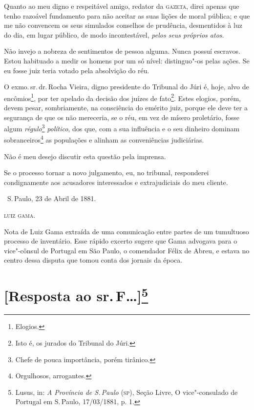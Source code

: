 Quanto ao meu digno e respeitável amigo, redator da \textsc{gazeta}, direi
apenas que tenho razoável fundamento para não aceitar as suas lições de
moral pública; e que me não convencem os seus simulados conselhos de
prudência, desmentidos à luz do dia, em lugar público, de modo
incontestável, \emph{pelos seus próprios atos}.

Não invejo a nobreza de sentimentos de pessoa alguma. Nunca possuí
escravos. Estou habituado a medir os homens por um só nível:
distinguo"-os pelas ações. Se eu fosse juiz teria votado pela absolvição
do réu.

O exmo.\,sr.\,dr.\,Rocha Vieira, digno presidente do Tribunal do Júri é,
hoje, alvo de encômios\footnote{Elogios.}, por ter apelado da decisão
dos juízes de fato\footnote{Isto é, os jurados do Tribunal do Júri.}.
Estes elogios, porém, devem pesar, sombriamente, na consciência do
emérito juiz, porque ele deve ter a segurança de que os não mereceria,
se o réu, em vez de mísero proletário, fosse algum
\emph{régulo}\footnote{Chefe de pouca importância, porém tirânico.}
\emph{político}, dos que, com a sua influência e o seu dinheiro dominam
sobranceiros\footnote{Orgulhosos, arrogantes.}
as populações e alinham as
conveniências judiciárias.

Não é meu desejo discutir esta questão pela imprensa.

Se o processo tornar a novo julgamento, eu, no tribunal, responderei
condignamente aos acusadores interessados e extrajudiciais do meu
cliente.

\bigskip

\hfill\ S.\,Paulo, 23 de Abril de 1881.\smallskip

\hfill\textsc{luiz gama}.

\pagebreak
\mbox{}\vfill
\thispagestyle{empty}

{\small\noindent
Nota de Luiz Gama extraída de uma comunicação entre partes de um
tumultuoso processo de inventário. Esse rápido excerto sugere que Gama
advogava para o vice"-cônsul de Portugal em São Paulo, o comendador Félix
de Abreu, e estava no centro dessa disputa que tomou conta dos jornais
da época.}

\chapter{{[}Resposta ao sr.\,F\ldots{}{]}\footnote[*]{Lusus, in: \emph{A Província de S.\,Paulo} (\textsc{sp}), Seção Livre, O vice"-consulado de Portugal em S.\,Paulo, 17/03/1881, p.
  1.}}


